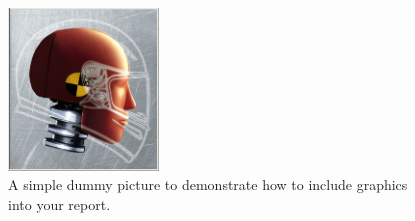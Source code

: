 \documentclass{ACGSeminar}
\begin{document}
\begin{figure}[htb!]
  \begin{centering}
    \includegraphics[width=4cm]{figures/dummy.jpg}\par
  \end{centering}
  \caption{A simple dummy picture to demonstrate how
           to include graphics into your report.}
  \label{fig:dummy}
\end{figure}


\printbibliography
\cleardoublepage
\end{document}
